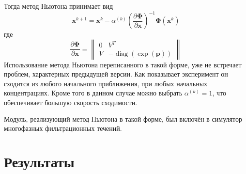 \documentclass[14pt,a4paper]{extarticle}
\newcommand{\pd}[2]{\frac{\partial #1}{\partial #2}}
\newcommand{\diag}{\operatorname{diag}}
\renewcommand{\vec}[1]{\boldsymbol{\mathbf{#1}}}
\begin{document}
Тогда метод Ньютона принимает вид\\
$$\vec{x}^{k+1} = \vec{x}^{k} - \alpha^{(k)}\left(\pd{\vec{\Phi}}{\vec{x}}\right)^{-1}\vec{\Phi}(\vec x^k)$$
 где $$\pd{\vec{\Phi}}{\vec{x}} = \begin{Vmatrix}
 0 & V^T \\
 V & -\diag({\exp(\vec{p})})
\end{Vmatrix}  $$
Использование метода Ньютона переписанного в такой форме, уже не встречает проблем, характерных предыдущей версии. Как показывает эксперимент он сходится из любого начального приближения, при любых начальных концентрациях. Кроме того в данном случае можно выбрать $\alpha^{(k)} = 1$, что обеспечивает большую скорость сходимости.

Модуль, реализующий метод Ньютона в такой форме, был включён в симулятор многофазных фильтрационных течений. 


\section{Результаты}
\end{document}
